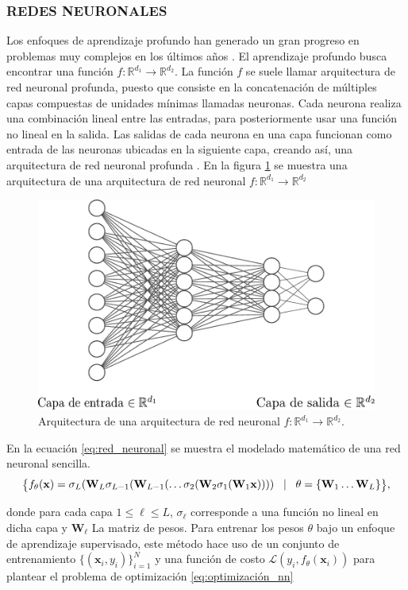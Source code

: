 \subsubsection{REDES NEURONALES}

Los enfoques de aprendizaje profundo han generado un gran progreso en problemas muy complejos en los últimos años
\cite{he2016deep,li2019deep,li2018deep, wang2019development,wu2016google}. El aprendizaje profundo busca encontrar una función $f: \mathbb{R}^{d_1} \rightarrow \mathbb{R}^{d_2}$. La función $f$ se suele llamar arquitectura de red neuronal profunda, puesto que consiste en la concatenación de múltiples capas compuestas de unidades mínimas llamadas neuronas. Cada neurona realiza una combinación lineal entre las entradas, para posteriormente usar una función no lineal en la salida. Las salidas de cada neurona en una capa funcionan como entrada de las neuronas ubicadas en la siguiente capa, creando así, una arquitectura de red neuronal profunda \cite{fan2019selective}. En la figura \ref{fig:nn} se muestra una arquitectura de una arquitectura de red neuronal $f: \mathbb{R}^{d_1} \rightarrow \mathbb{R}^{d_2}$

\begin{figure}[H]
    \centering
    \includegraphics[width=0.6\linewidth]{images/nn.pdf}
    \caption{Arquitectura de una arquitectura de red neuronal $f: \mathbb{R}^{d_1} \rightarrow \mathbb{R}^{d_2}$.}
    \label{fig:nn}
\end{figure}

En la ecuación \ref{eq:red_neuronal} se muestra el modelado matemático de una red neuronal sencilla. 
\begin{equation}
    \footnotesize 
    \big\{f_\theta(\mathbf{x}) = \sigma_{L}(\mathbf{W}_{L}\sigma_{L-1}(\mathbf{W}_{L-1} (\dots \sigma_2(\mathbf{W}_2\sigma_1(\mathbf{W}_1\mathbf{x})))) \quad \vert \quad\theta = \{\mathbf{W}_{1} \dots \mathbf{W}_{L}\}  \big\},
    \label{eq:red_neuronal}
\end{equation}

donde para cada capa $1 \leq \ell \leq L$, $\sigma_\ell$ corresponde a una función no lineal en dicha capa y $\mathbf{W}_\ell$ La matriz de pesos. Para entrenar los pesos $\theta$ bajo un enfoque de aprendizaje supervisado, este método hace uso de un conjunto de entrenamiento $\{(\mathbf{x}_i, y_i) \}_{i=1}^{N}$ y una función de costo $\mathcal{L}( y_i,  f_\theta(\mathbf{x}_i))$ para plantear el problema de optimización \ref{eq:optimización_nn}

